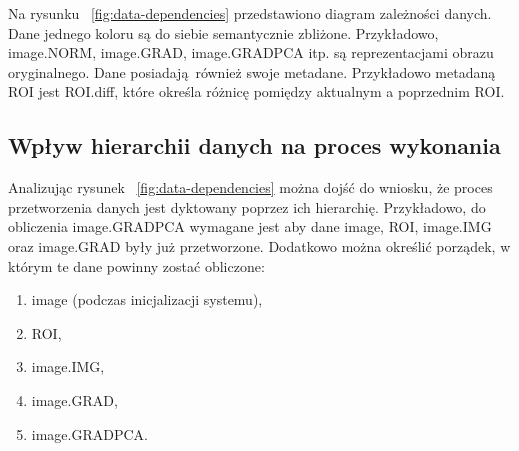 
Na rysunku ~\ref{fig:data-dependencies} przedstawiono diagram zależności danych. Dane jednego koloru są do siebie semantycznie zbliżone. Przykładowo, image.NORM, image.GRAD, image.GRADPCA itp. są reprezentacjami obrazu oryginalnego. Dane posiadają również swoje metadane. Przykładowo metadaną ROI jest ROI.diff, które określa różnicę pomiędzy aktualnym a poprzednim ROI. 

\subsection{Wpływ hierarchii danych na proces wykonania}
Analizując rysunek ~\ref{fig:data-dependencies} można dojść do wniosku, że proces przetworzenia danych jest dyktowany poprzez ich hierarchię. Przykładowo, do obliczenia image.GRADPCA wymagane jest aby dane image, ROI, image.IMG oraz image.GRAD były już przetworzone. Dodatkowo można określić porządek, w którym te dane powinny zostać obliczone:

\begin{enumerate}[labelwidth=\widthof{\ref{last-item}},label=\arabic*.]
	\item image (podczas inicjalizacji systemu),
	\item ROI,
	\item image.IMG,
	\item image.GRAD,
	\item image.GRADPCA. \label{last-item}
\end{enumerate}

